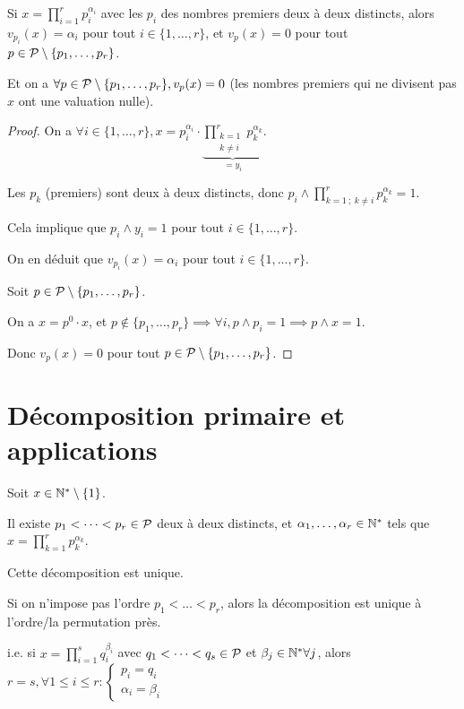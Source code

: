 \documentclass[12pt, a4paper]{report}
\begin{document}
\begin{property}
    Si $x=\prod_{i=1}^r  p_i^{\alpha_i}$ avec les $p_i$ des nombres premiers deux à deux distincts, alors $v_{p_i}(x) = \alpha_i$ pour tout $i \in \{1,\dots,r\}$, et $v_p(x) = 0$ pour tout $p \in \mathcal{P}\setminus\{p_1,\dots,p_r\}$.

    Et on a $\forall p \in \mathcal{P}\setminus\{p_1,\dots,p_r\}, v_p(x) = 0$ (les nombres premiers qui ne divisent pas $x$ ont une valuation nulle).
\end{property}

\begin{proof}
    On a $\forall i \in \{1,\dots,r\}, x = p_i^{\alpha_i}\cdot \underbrace{\prod_{\substack{k=1 \\ k\ne i}}^{r}p_k^{\alpha_k}}_{=y_i}$.

    Les $p_k$ (premiers) sont deux à deux distincts, donc $p_i \wedge \prod_{k=1~;~k\ne i}^{r}p_k^{\alpha_k} = 1$.

    Cela implique que $p_i \wedge y_i = 1$ pour tout $i \in \{1,\dots,r\}$.

    On en déduit que $v_{p_i}(x) = \alpha_i$ pour tout $i \in \{1,\dots,r\}$.

    Soit $p \in \mathcal{P}\setminus\{p_1,\dots,p_r\}$.

    On a $x=p^0 \cdot x$, et $p\notin\{p_1,\dots,p_r\} \implies \forall i, p\wedge p_i = 1 \implies p \wedge x = 1$.

    Donc $v_p(x) = 0$ pour tout $p \in \mathcal{P}\setminus\{p_1,\dots,p_r\}$.
\end{proof}

\section{Décomposition primaire et applications}

\begin{theorem}

    Soit $x\in \mathbb{N}^*\setminus\{1\}$.

    Il existe $p_1<\dots<p_r \in \mathcal{P}$ deux à deux distincts, et $\alpha_1,\dots,\alpha_r \in \mathbb{N}^*$ tels que $x = \prod_{k=1}^{r} p_k^{\alpha_k}$.

    Cette décomposition est unique.

    Si on n'impose pas l'ordre $p_1 < \dots < p_r$, alors la décomposition est unique à l'ordre/la permutation près.

    i.e. si $x=\prod_{i=1}^s q_i^{\beta_i}$ avec $q_1 < \dots < q_s \in \mathcal{P}$ et $\beta_j \in \mathbb{N}^* \forall j$, alors $r=s, \forall 1 \le i \le r : \begin{cases}
    p_i = q_i\\
    \alpha_i = \beta_i
    \end{cases}$
\end{theorem}
\end{document}
